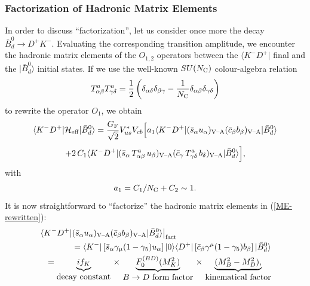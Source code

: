 \documentclass[11pt]{cernrep}
\begin{document}
\subsubsection{Factorization of Hadronic Matrix Elements}\label{ssec:ME-fact}
%
%
%
In order to discuss ``factorization'', let us consider once more 
the decay $\bar B^0_d\to D^+K^-$. Evaluating the corresponding 
transition amplitude, we encounter the hadronic matrix elements of the 
$O_{1,2}$ operators between the $\langle K^-D^+|$ final and the 
$|\bar B^0_d\rangle$ initial states. If we use the well-known 
$SU(N_{\rm C})$ colour-algebra relation
\begin{equation}
T^a_{\alpha\beta}T^a_{\gamma\delta}=\frac{1}{2}\left(\delta_{\alpha\delta}
\delta_{\beta\gamma}-\frac{1}{N_{\rm C}}\delta_{\alpha\beta}
\delta_{\gamma\delta}\right)
\end{equation}
to rewrite the operator $O_1$, we obtain
\begin{displaymath}
\langle K^-D^+|{\cal H}_{\rm eff}|\bar B^0_d\rangle=
\frac{G_{\rm F}}{\sqrt{2}}V_{us}^\ast V_{cb}\Bigl[a_1\langle K^-D^+|
(\bar s_\alpha u_\alpha)_{\mbox{{\scriptsize V--A}}}
(\bar c_\beta b_\beta)_{\mbox{{\scriptsize V--A}}}
|\bar B^0_d\rangle
\end{displaymath}
\vspace*{-0.3truecm}
\begin{equation}\label{ME-rewritten}
+2\,C_1\langle K^-D^+|
(\bar s_\alpha\, T^a_{\alpha\beta}\,u_\beta)_{\mbox{{\scriptsize 
V--A}}}(\bar c_\gamma 
\,T^a_{\gamma\delta}\,b_\delta)_{\mbox{{\scriptsize V--A}}}
|\bar B^0_d\rangle\Bigr],\nonumber
\end{equation}
with
\begin{equation}\label{a1-def}
a_1=C_1/N_{\rm C}+C_2 \sim 1.
\end{equation}
It is now straightforward to ``factorize'' the hadronic matrix elements
in (\ref{ME-rewritten}):
\begin{eqnarray}
\lefteqn{\left.\langle K^-D^+|
(\bar s_\alpha u_\alpha)_{\mbox{{\scriptsize 
V--A}}}(\bar c_\beta b_\beta)_{\mbox{{\scriptsize V--A}}}
|\bar B^0_d\rangle\right|_{\rm fact}}\nonumber\\
&&=\langle K^-|\left[\bar s_\alpha\gamma_\mu(1-\gamma_5)u_\alpha\right]
|0\rangle\langle D^+|\left[\bar c_\beta\gamma^\mu
(1-\gamma_5)b_\beta\right]|\bar B^0_d\rangle\nonumber\\
&&=\underbrace{i f_K}_{\mbox{decay constant}} \, \times \, 
\underbrace{F^{(BD)}_0(M_K^2)}_{\mbox{$B\to D$ form factor}} 
\, \times \,\underbrace{(M_B^2-M_D^2),}_{\mbox{kinematical factor}}
\end{eqnarray}
\end{document}

